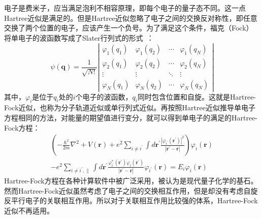 电子是费米子，应当满足泡利不相容原理，即每个电子的量子态不同。这一点Hartree近似是满足的。但是Hartree近似忽略了电子之间的交换反对称性，即任意交换了两个位置的电子，应该产生一个负号。为了满足这个条件，福克（Fock）将单电子的波函数写成了Slater行列式的形式~\citep{Slater30,1930fock}：
\begin{equation}
    \label{eq:2-9}
    \psi(\mathbf{q})=\frac{1}{\sqrt{N !}}\left|\begin{array}{cccc}
    \varphi_{1}\left(q_{1}\right) & \varphi_{1}\left(q_{2}\right) & \cdots & \varphi_{1}\left(q_{N}\right) \\
    \varphi_{2}\left(q_{1}\right) & \varphi_{2}\left(q_{2}\right) & \cdots & \varphi_{2}\left(q_{N}\right) \\
    \vdots & \vdots & \ddots & \vdots \\
    \varphi_{N}\left(q_{1}\right) & \varphi_{N}\left(q_{2}\right) & \cdots & \varphi_{N}\left(q_{N}\right)
    \end{array}\right|
\end{equation}
其中，$\varphi_{i}$是位于$q_i$处的$i$个电子的波函数，$q_i$同时包含位置和自旋。这就是Hartree-Fock近似，也称为分子轨道近似或单行列式近似。再按照Hartree近似推导单电子方程相同的方法，对能量的期望值进行变分，就可以得到单电子的满足的Hartree-Fock方程：
\begin{equation}
    \label{eq:2-10}
    \begin{array}{c}
    \left(-\frac{\hbar^{2}}{2 m} \nabla^{2}+V(\mathbf{r})+e^{2} \sum_{i \neq i^{\prime}} \int d \mathbf{r}^{\prime} \frac{\left|\varphi_{i^{\prime}}\left(\mathbf{r}^{\prime}\right)\right|^{2}}{\left|\mathbf{r}^{\prime}-\mathbf{r}\right|}\right) \varphi_{i}(\mathbf{r}) \\
    -e^{2} \sum_{i \neq i^{\prime}, \|} \int d \mathbf{r}^{\prime} \frac{\varphi_{i^{\prime}}^{*}\left(\mathbf{r}^{\prime}\right) \varphi_{i}\left(\mathbf{r}^{\prime}\right)}{\left|\mathbf{r}^{\prime}-\mathbf{r}\right|} \varphi_{i^{\prime}}(\mathbf{r})=E_{i} \varphi_{i}(\mathbf{r})
    \end{array}
\end{equation}
Hartree-Fock方程在各种计算软件中被广泛采用，被认为是现代量子化学的基石。然而Hartree-Fock近似虽然考虑了电子之间的交换相互作用，但是却没有考虑自旋反平行电子的关联相互作用。所以对于关联相互作用比较强的体系，Hartree-Fock近似不再适用。



